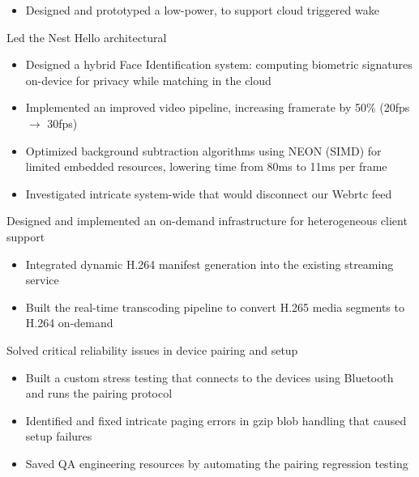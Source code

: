 \begin{cventries}
{\begin{cvitems}
\begin{itemize}
\begin{itemize}
        \item {Wrote the Event-Based Recording logic in Battery product, directly improving user experience through intelligent alerts}
      \end{itemize}
    \item {Designed and prototyped a low-power,  to support cloud triggered wake}
  \end{itemize}
\item {Led the Nest Hello architectural }
  \begin{itemize}
    \item {Designed a hybrid Face Identification system: computing biometric signatures on-device for privacy while matching in the cloud}
    \item {Implemented an improved video pipeline, increasing framerate by 50\% (20fps $\rightarrow$ 30fps)}
    \item {Optimized background subtraction algorithms using NEON (SIMD) for limited embedded resources, lowering time from 80ms to 11ms per frame}
    \item {Investigated intricate system-wide  that would disconnect our Webrtc feed}
  \end{itemize}
\item {Designed and implemented an on-demand  infrastructure for heterogeneous client support}
  \begin{itemize}
    \item {Integrated dynamic H.264 manifest generation into the existing streaming service}
    \item {Built the real-time transcoding pipeline to convert H.265 media segments to H.264 on-demand}
  \end{itemize}
\item {Solved critical reliability issues in device pairing and setup}
  \begin{itemize}
    \item {Built a custom stress testing  that connects to the devices using Bluetooth and runs the pairing protocol}
    \item {Identified and fixed intricate paging errors in gzip blob handling that caused setup failures}
    \item {Saved QA engineering resources by automating the pairing regression testing}
  \end{itemize}

\end{cvitems}}
\end{cventries}
